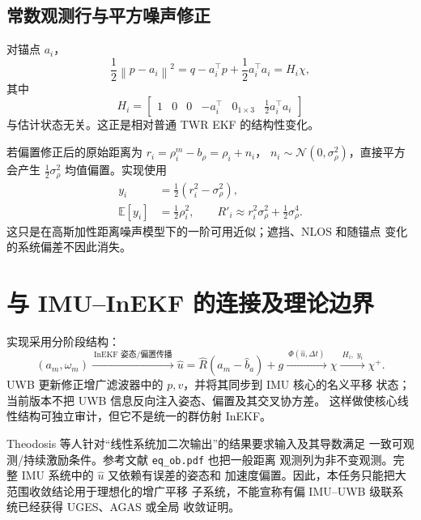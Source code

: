 \documentclass[11pt,a4paper]{ctexart}
\newcommand{\norm}[1]{\left\lVert #1\right\rVert}
\begin{document}
\subsection{常数观测行与平方噪声修正}

对锚点 $a_i$，
\begin{equation}
\frac12\norm{p-a_i}^2
=q-a_i^\top p+\frac12a_i^\top a_i
=H_i\chi,
\end{equation}
其中
\begin{equation}
\boxed{
H_i=
\begin{bmatrix}
1&0&0&-a_i^\top&0_{1\times3}&\frac12a_i^\top a_i
\end{bmatrix}}
\label{eq:constant-observation}
\end{equation}
与估计状态无关。这正是相对普通 TWR EKF 的结构性变化。

若偏置修正后的原始距离为
$r_i=\rho_i^{m}-b_\rho=\rho_i+n_i$，
$n_i\sim\mathcal N(0,\sigma_\rho^2)$，直接平方会产生
$\tfrac12\sigma_\rho^2$ 均值偏置。实现使用
\begin{align}
 y_i&=\frac12\left(r_i^2-\sigma_\rho^2\right),\\
 \mathbb E[y_i]&=\frac12\rho_i^2,\qquad
 R'_i\approx r_i^2\sigma_\rho^2+\frac12\sigma_\rho^4.
 \label{eq:squared-noise}
\end{align}
这只是在高斯加性距离噪声模型下的一阶可用近似；遮挡、NLOS 和随锚点
变化的系统偏差不因此消失。

\section{与 IMU--InEKF 的连接及理论边界}

实现采用分阶段结构：
\begin{equation}
\boxed{
(a_m,\omega_m)
\xrightarrow{\ \text{InEKF 姿态/偏置传播}\ }
\hat u=\hat R(a_m-\hat b_a)+g
\xrightarrow{\ \Phi(\hat u,\Delta t)\ }
\chi
\xrightarrow{\ H_i,\;y_i\ }
\chi^+ .}
\label{eq:cascade}
\end{equation}
UWB 更新修正增广滤波器中的 $p,v$，并将其同步到 IMU 核心的名义平移
状态；当前版本不把 UWB 信息反向注入姿态、偏置及其交叉协方差。
这样做使核心线性结构可独立审计，但它不是统一的群仿射 InEKF。

Theodosis 等人针对“线性系统加二次输出”的结果要求输入及其导数满足
一致可观测/持续激励条件。参考文献 \texttt{eq\_ob.pdf} 也把一般距离
观测列为非不变观测。完整 IMU 系统中的 $\hat u$ 又依赖有误差的姿态和
加速度偏置。因此，本任务只能把大范围收敛结论用于理想化的增广平移
子系统，不能宣称有偏 IMU--UWB 级联系统已经获得 UGES、AGAS 或全局
收敛证明。
\end{document}
